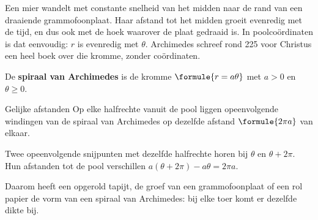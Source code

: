 Een mier wandelt met constante snelheid van het midden naar de rand van een draaiende grammofoonplaat. Haar afstand tot het midden groeit evenredig met de tijd, en dus ook met de hoek waarover de plaat gedraaid is. In poolcoördinaten is dat eenvoudig: $r$ is evenredig met $\theta$. Archimedes schreef rond 225 voor Christus een heel boek over die kromme, zonder coördinaten.

\begin{theorie}
De \textbf{\textcolor{accent}{spiraal van Archimedes}} is de kromme $\formule{r = a\theta}$ met $a > 0$ en $\theta \geqslant 0$.

\begin{stelling}{Gelijke afstanden}
Op elke halfrechte vanuit de pool liggen opeenvolgende windingen van de spiraal van Archimedes op dezelfde afstand $\formule{2\pi a}$ van elkaar.
\end{stelling}

\begin{bewijs}
Twee opeenvolgende snijpunten met dezelfde halfrechte horen bij $\theta$ en $\theta + 2\pi$. Hun afstanden tot de pool verschillen $a(\theta + 2\pi) - a\theta = 2\pi a$.
\end{bewijs}
\end{theorie}


Daarom heeft een opgerold tapijt, de groef van een grammofoonplaat of een rol papier de vorm van een spiraal van Archimedes: bij elke toer komt er dezelfde dikte bij.



